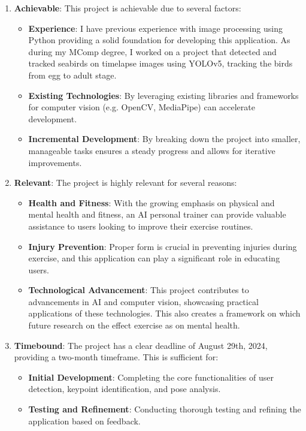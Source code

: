 \begin{enumerate}
        \item \textbf{Achievable}: This project is achievable due to several factors:
        \begin{itemize}
            \item \textbf{Experience}: I have previous experience with image processing using Python providing a solid foundation for developing this application. As during my MComp degree, I worked on a project that detected and tracked seabirds on timelapse images using YOLOv5, tracking the birds from egg to adult stage. 
            \item \textbf{Existing Technologies}: By leveraging existing libraries and frameworks for computer vision (e.g. OpenCV, MediaPipe) can accelerate development.
            \item \textbf{Incremental Development}: By breaking down the project into smaller, manageable tasks ensures a steady progress and allows for iterative improvements.
        \end{itemize}
        
        \item \textbf{Relevant}: The project is highly relevant for several reasons:
        \begin{itemize}
            \item \textbf{Health and Fitness}: With the growing emphasis on physical and mental health and fitness, an AI personal trainer can provide valuable assistance to users looking to improve their exercise routines.
            \item \textbf{Injury Prevention}: Proper form is crucial in preventing injuries during exercise, and this application can play a significant role in educating users.
            \item \textbf{Technological Advancement}: This project contributes to advancements in AI and computer vision, showcasing practical applications of these technologies. This also creates a framework on which future research on the effect exercise as on mental health.
        \end{itemize}
        
        \item \textbf{Timebound}: The project has a clear deadline of August 29th, 2024, providing a two-month timeframe. This is sufficient for:
        \begin{itemize}
            \item \textbf{Initial Development}: Completing the core functionalities of user detection, keypoint identification, and pose analysis.
            \item \textbf{Testing and Refinement}: Conducting thorough testing and refining the application based on feedback.
        \end{itemize}
        
    \end{enumerate}  
